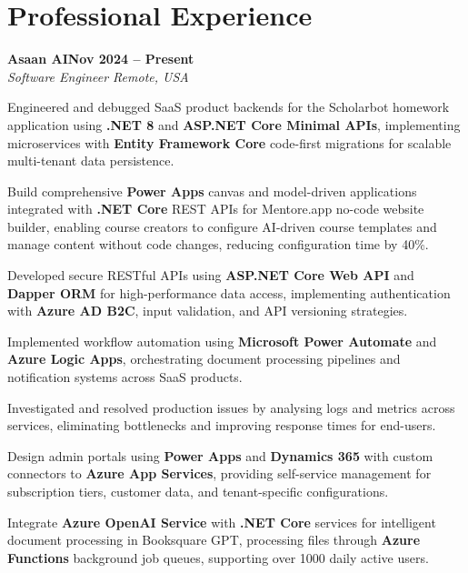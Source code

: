 \documentclass[letterpaper,10pt]{article}
\newcommand{\headingBf}[2]{
  \hspace{10pt}\textbf{#1}\hfill\textbf{#2}\\
}
\newcommand{\headingIt}[2]{
  \hspace{10pt}\textit{#1}\hfill\textit{#2}\\
}
\newenvironment{resume_list}{
  \vspace{-7pt}
  \begin{itemize}[itemsep=-2px, parsep=1pt, leftmargin=30pt]
}{
  \end{itemize}
}
\begin{document}
\section{Professional Experience}

\headingBf{Asaan AI}{Nov 2024 -- Present}
\headingIt{Software Engineer \hfill Remote, USA}{}
\begin{resume_list}
    \item Engineered and debugged SaaS product backends for the Scholarbot homework application using \textbf{.NET 8} and \textbf{ASP.NET Core Minimal APIs}, implementing microservices with \textbf{Entity Framework Core} code-first migrations for scalable multi-tenant data persistence.
    \item Build comprehensive \textbf{Power Apps} canvas and model-driven applications integrated with \textbf{.NET Core} REST APIs for Mentore.app no-code website builder, enabling course creators to configure AI-driven course templates and manage content without code changes, reducing configuration time by 40\%.
    \item Developed secure RESTful APIs using \textbf{ASP.NET Core Web API} and \textbf{Dapper ORM} for high-performance data access, implementing authentication with \textbf{Azure AD B2C}, input validation, and API versioning strategies.
    \item Implemented workflow automation using \textbf{Microsoft Power Automate} and \textbf{Azure Logic Apps}, orchestrating document processing pipelines and notification systems across SaaS products.
    \item Investigated and resolved production issues by analysing logs and metrics across services, eliminating bottlenecks and improving response times for end-users.
    \item Design admin portals using \textbf{Power Apps} and \textbf{Dynamics 365} with custom connectors to \textbf{Azure App Services}, providing self-service management for subscription tiers, customer data, and tenant-specific configurations.
    \item Integrate \textbf{Azure OpenAI Service} with \textbf{.NET Core} services for intelligent document processing in Booksquare GPT, processing files through \textbf{Azure Functions} background job queues, supporting over 1000 daily active users.
\end{resume_list}
\end{document}
